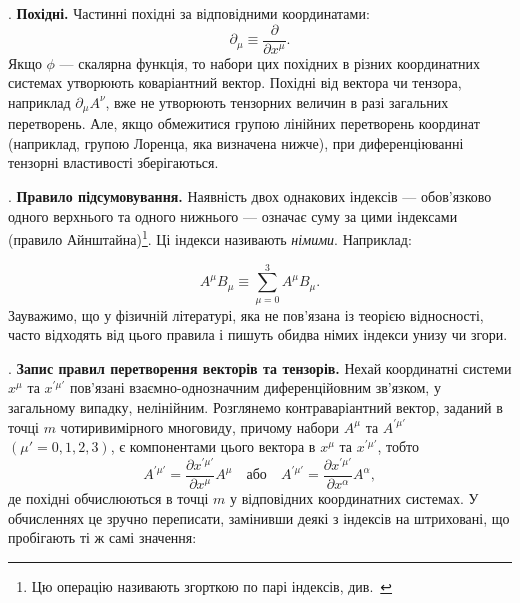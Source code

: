 \element. \textbf{Похідні.} Частинні похідні за відповідними координатами:
\begin{equation*}
  \partial_\mu \equiv \frac{\partial}{\partial x^\mu}.
\end{equation*}
Якщо $\phi$ --- скалярна функція, то набори цих похідних в різних координатних системах утворюють коваріантний вектор.
Похідні від вектора чи тензора, наприклад $\partial_\mu A^\nu$, вже не утворюють тензорних величин в разі загальних
перетворень. Але, якщо обмежитися групою лінійних перетворень координат (наприклад, групою Лоренца, яка визначена
нижче), при диференціюванні тензорні властивості зберігаються.

\element. \textbf{Правило підсумовування.} Наявність двох однакових індексів --- обов'язково одного верхнього та одного
нижнього --- означає суму за цими індексами (правило Айнштайна)\footnote{Цю операцію називають згорткою по парі
індексів, див.~}. Ці індекси називають \textit{німими}. Наприклад:

\begin{equation*}
  A^\mu B_\mu \equiv \sum_{\mu=0}^{3} A^\mu B_\mu.
\end{equation*}
Зауважимо, що у фізичній літературі, яка не пов'язана із теорією відносності, часто відходять від цього правила і пишуть
обидва німих індекси унизу чи згори.

\element. \textbf{Запис правил перетворення векторів та тензорів.} Нехай координатні системи $x^\mu$ та $x^{\prime\mu'}$
пов'язані взаємно-однозначним диференційовним зв'язком, у загальному випадку, нелінійним. Розглянемо контраваріантний
вектор, заданий в точці $m$ чотиривимірного многовиду, причому набори $A^\mu$ та $A^{\prime\mu'}$ $(\mu' = 0,1,2,3)$, є
компонентами цього вектора в $x^\mu$ та $x^{\prime\mu'}$, тобто
\begin{equation*}
  A^{\prime\mu'} = \frac{\partial x^{\prime\mu'}}{\partial x^\mu} A^\mu
  \quad\text{або}\quad
  A^{\prime\mu'} = \frac{\partial x^{\prime\mu'}}{\partial x^\alpha} A^\alpha,
\end{equation*}
де похідні обчислюються в точці $m$ у відповідних координатних системах. У обчисленнях це зручно переписати, замінивши
деякі з індексів на штриховані, що пробігають ті ж самі значення:

